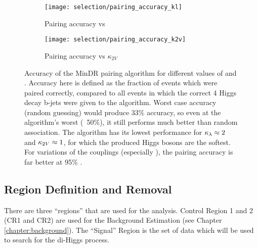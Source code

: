         \begin{figure}[hbt]
            \centering
            \begin{subfigure}{0.48\textwidth}
                \texttt{[image: selection/pairing\_accuracy\_kl]}
                \captionsetup{justification=centering} \caption{Pairing accuracy vs \kl}
                \label{fig:acc_kl_exists}
            \end{subfigure}
            \begin{subfigure}{0.48\textwidth}
                \texttt{[image: selection/pairing\_accuracy\_k2v]}
                \captionsetup{justification=centering} \caption{Pairing accuracy vs $\kappa_{2V}$}
                \label{fig:acc_k2v_exists}
            \end{subfigure}
            \caption{Accuracy of the MinDR pairing algorithm for different values of \kv and \kvv.
                Accuracy here is defined as the fraction of events which were paired correctly,
                compared to all events in which the correct 4 Higgs decay b-jets were given to the algorithm.
                Worst case accuracy (random guessing) would produce 33\% accuracy,
                    so even at the algorithm's worst (~50\%),
                    it still performs much better than random association.
                The algorithm has its lowest performance for $\kappa_{\lambda} \approx 2$ and $\kappa_{2V} \approx 1$,
                    for which the produced Higgs bosons are the softest.
                For variations of the couplings (especially \kvv),
                    the pairing accuracy is far better at 95\% \cite{hh4b_2021_int_note}.
                }
            \label{fig:HHpairing}
        \end{figure}
                                                                                                         


    \FloatBarrier
    \subsection{ Region Definition and \ttbar Removal}
        
        There are three ``regions'' that are used for the analysis.
        Control Region 1 and 2 (CR1 and CR2) are used for the Background Estimation (see Chapter \ref{chapter:background}).
        The ``Signal'' Region is the set of data which will be used to search for the di-Higgs process.

